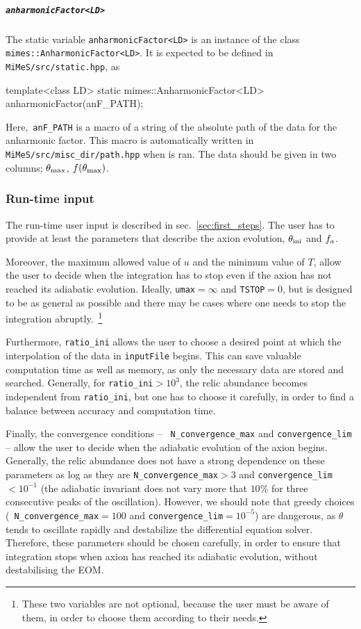 \documentclass[11pt,a4paper]{article}
\begin{document}
\subparagraph{{\tt anharmonicFactor<LD>}} The static variable {\tt anharmonicFactor<LD>} is an instance of the class {\tt mimes::AnharmonicFactor<LD>}. It is expected to be defined in  {\tt MiMeS/src/static.hpp}, as 
%
\begin{cpp}
	template<class LD> static mimes::AnharmonicFactor<LD> anharmonicFactor(anF_PATH);
\end{cpp}
%
Here,~{\tt anF\_PATH} is a macro of a string of the absolute path of the data for the anharmonic factor. This macro is automatically
written in {\tt MiMeS/src/misc\_dir/path.hpp} when  is ran. The data should be given in two columns; $\theta_{\rm max}{}$, $f(\theta_{\rm max}{})$.

\subsubsection{Run-time input}\label{sec:run_time_input}
%
The run-time user input is described in sec.~\ref{sec:first_steps}. The user has to provide at least the parameters that describe the axion evolution, $\theta_{\rm ini}{}$ and $f_{a}{}$. 

Moreover,  the maximum allowed value of $u$ and the minimum value of $T$, allow the user to decide when the integration has to stop even if the axion has not reached its adiabatic evolution. Ideally, {\tt umax}$=\infty$ and {\tt TSTOP}$=0$, but \mimes is designed to be as general as possible and there may be cases where one needs to stop the integration abruptly.~\footnote{These two variables are not optional, because the user must be aware of them, in order to choose them according to their needs.}

Furthermore, {\tt ratio\_ini} allows the user to choose a desired point at which the interpolation of the data in {\tt inputFile} begins. This can save valuable computation time as well as memory, as only the necessary data are stored and searched. Generally, for {\tt ratio\_ini}$>10^{3}$, the relic abundance becomes
independent from  {\tt ratio\_ini}, but one has to choose it carefully, in order to find a balance between accuracy and computation time.

Finally, the convergence conditions -- \ie~{\tt N\_convergence\_max} and {\tt convergence\_lim} -- allow the user to decide when the adiabatic evolution of the axion begins. Generally, the relic abundance does not have a strong dependence on these parameters as log as they are  {\tt N\_convergence\_max}$>3$ and {\tt convergence\_lim}$<10^{-1}$ (\ie the adiabatic invariant does not vary more that $10\%$ for three consecutive peaks of the oscillation). 
%
However, we should note that greedy choices (\eg~{\tt N\_convergence\_max}$=100$ and {\tt convergence\_lim}$=10^{-5}$) are dangerous, as $\theta$ tends to oscillate rapidly and destabilize the differential equation solver. Therefore, these parameters should be chosen carefully, in order to ensure that integration stops when axion has reached its adiabatic evolution, without destabilising the EOM.
\end{document}
